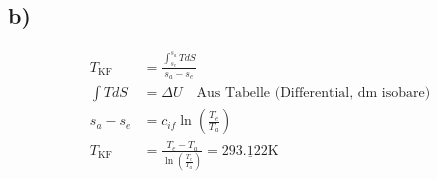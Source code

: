 

\subsection*{b)}
\begin{align*}
    T_{\text{KF}} &= \frac{\int_{s_e}^{s_a} T dS}{s_a - s_e} \\
    \int T dS &= \Delta U \quad \text{Aus Tabelle (Differential, dm isobare)} \\
    s_{a} - s_{e} &= c_{if} \ln \left( \frac{T_e}{T_a} \right) \\
    T_{\text{KF}} &= \frac{T_e - T_a}{\ln \left( \frac{T_e}{T_a} \right)} = \underline{293.122 \text{K}}
\end{align*}